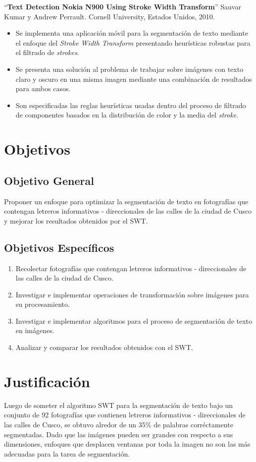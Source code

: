 ``\textbf{Text Detection Nokia N900 Using Stroke Width Transform}'' Sauvar Kumar
y Andrew Perrault. Cornell University, Estados Unidos,
2010.\cite{Saurav:SWT:2010}
\begin{itemize}
	\item Se implementa una aplicación móvil para la segmentación de texto
mediante el enfoque del \textit{Stroke Width Transform} presentando heurísticas
robustas para el filtrado de \textit{strokes}.
	\item Se presenta una solución al problema de trabajar sobre imágenes con
texto claro y oscuro en una misma imagen mediante una combinación de resultados
para ambos casos.
	\item Son especificadas las reglas heurísticas usadas dentro del proceso de
filtrado de componentes basados en la distribución de color y la media del
\textit{stroke}.
\end{itemize}

\section{Objetivos}
  \subsection{Objetivo General}
  Proponer un enfoque para optimizar la segmentación de texto en fotografías que
contengan letreros informativos - direccionales de las calles de la ciudad de
Cusco y mejorar los resultados obtenidos por el SWT.
  \subsection{Objetivos Específicos}
  \begin{enumerate}
  	\item Recolectar fotografías que contengan letreros informativos -
direccionales de las calles de la ciudad de Cusco.
    \item Investigar e implementar operaciones de transformación sobre imágenes
para su procesamiento.
    \item Investigar e implementar algoritmos para el proceso de segmentación de
texto en imágenes.
    \item Analizar y comparar los resultados obtenidos con el SWT.
  \end{enumerate}

\section{Justificación}
	Luego de someter el algoritmo SWT para la segmentación de texto bajo un
conjunto de 92 fotografías que contienen letreros informativos - direccionales
de las calles de Cusco, se obtuvo alredor de un $35\%$ de palabras corréctamente
segmentadas. Dado que las imágenes pueden ser grandes con respecto a sus
dimensiones, enfoques que desplacen ventanas por toda la imagen no son las más
adecuadas para la tarea de segmentación. 
 
